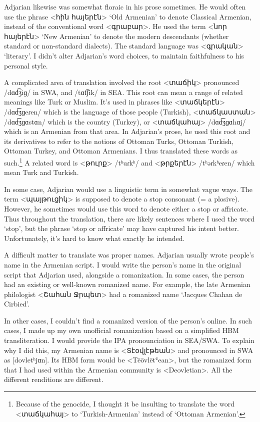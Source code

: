 Adjarian likewise was somewhat floraic in his prose sometimes. He would often use the phrase <հին հայերէն> `Old Armenian' to denote Classical Armenian, instead of the conventional word <գրաբար>. He used the term <նոր հայերէն> `New Armenian' to denote the modern descendants (whether standard or non-standard dialects). The standard language was <գրական> `literary'. I didn't alter Adjarian's word choices, to maintain faithfulness to his personal style. 

A complicated area of translation involved the root <տաճիկ> pronounced /dɑd͡ʒiɡ/ in SWA, and /tɑt͡ʃik/ in SEA. This root can mean a range of related meanings like Turk or Muslim. It's used in phrases like <տաճկերէն> /dɑd͡ʒɡeɾen/ which is the language of those people (Turkish), <տաճկաստան> /dɑd͡ʒɡɑstɑn/ which is the country (Turkey), or <տաճկահայ> /dɑd͡ʒɡɑhɑj/ which is an Armenian from that area. In Adjarian's prose, he used this root and its derivatives to refer to the notions of  Ottoman Turks, Ottoman Turkish, Ottoman Turkey, and Ottoman Armenians. I thus translated these words as such.\footnote{Because of the genocide, I thought it be insulting to translate the word  <տաճկահայ> to `Turkish-Armenian' instead of `Ottoman Armenian'. } A related word is <թուրք> /tʰuɾkʰ/ and <թրքերէն> /tʰəɾkʰeɾen/ which mean Turk and Turkish. 

In some case, Adjarian would use a linguistic term in somewhat vague ways. The term <պայթուցիկ> is supposed to denote a stop consonant (= a plosive). However, he sometimes would use this word to denote either a stop or affricate. Thus throughout the translation, there are likely sentences where I used the word `stop', but the phrase `stop  or affricate' may have captured his intent better. Unfortunately, it's hard to know what exactly he intended. 

A difficult matter to translate was proper names. Adjarian usually wrote people's name in the Armenian script. I would write the person's name in the original script that Adjarian used, alongside a romanization. In some cases, the person had an existing or well-known romanized name. For example, the late Armenian philologist <Շահան Ջրպետ> had a romanized name `Jacques Chahan de Cirbied'. 

In other cases, I couldn't find a romanized version of the  person's online. In such cases, I made up my own unofficial romanization based on a simplified HBM transliteration. I would provide  the IPA pronounciation in SEA/SWA.  To explain why I did this, my Armenian name is <Տէօվլէթեան> and pronounced in SWA as [dovletʰjɑn]. Its HBM form would be <Tēōvlētʿean>, but the romanized form that I had used within the Armenian community is <Deovletian>.  All the different renditions are different.

